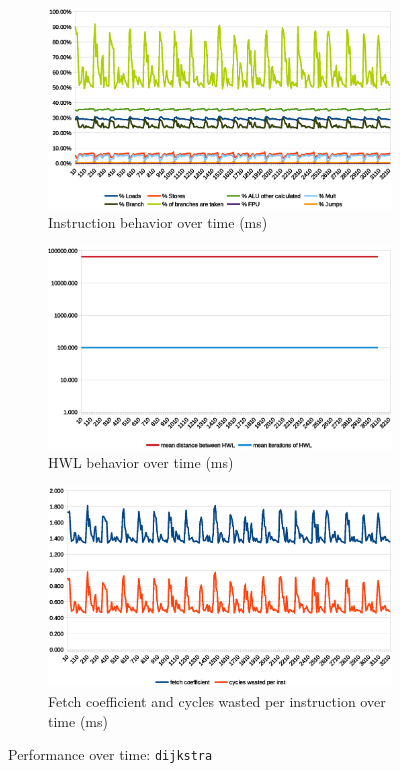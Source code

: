 \documentclass[../bachelor_paper.tex]{subfiles}
\begin{document}
\begin{figure}
    \begin{subfigure}{0.45\textwidth}
        \includegraphics[width=\textwidth]{img/graph/mibench/dijkstra_inst.eps}
        \caption{Instruction behavior over time (ms)}
    \end{subfigure}
    \begin{subfigure}{0.45\textwidth}
        \includegraphics[width=\textwidth]{img/graph/mibench/dijkstra_hwl.eps}
        \caption{\ac{HWL} behavior over time (ms)}
    \end{subfigure}
    \begin{subfigure}{0.45\textwidth}
        \includegraphics[width=\textwidth]{img/graph/mibench/dijkstra_fetch_waste.eps}
        \caption{Fetch coefficient and cycles wasted per instruction over time (ms)}
    \end{subfigure}
    \caption{Performance over time: \texttt{dijkstra}}
\end{figure}
\end{document}
